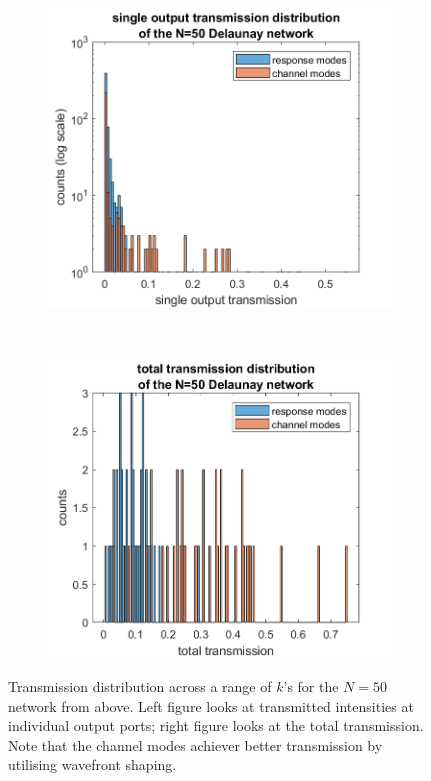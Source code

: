 \begin{figure}[hbp]
    \centering
    \begin{subfigure}[b]{0.4\textwidth}
        \includegraphics[width=\textwidth]{ch3/fig3/N50d_singleT.png}
    \end{subfigure}
~\quad\quad
    \begin{subfigure}[b]{0.4\textwidth}
        \includegraphics[width=\textwidth]{ch3/fig3/N50d_totalT.png}
    \end{subfigure}
    \caption{Transmission distribution across a range of $k$'s for the $N=50$ network from above. Left figure looks at transmitted intensities at individual output ports; right figure looks at the total transmission. Note that the channel modes achiever better transmission by utilising wavefront shaping.}\label{fig:N50_T_hist}
\end{figure}

